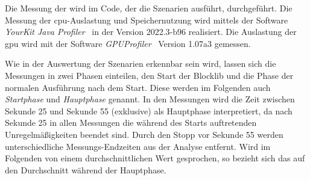 Die Messung der \si{\fps} wird im Code, der die Szenarien ausführt, durchgeführt. Die Messung der \ac{cpu}-Auslastung und Speichernutzung wird mittels der Software \emph{YourKit Java Profiler}~\cite{YourKitGmbH} in der Version 2022.3-b96 realisiert. Die Auslastung der \ac{gpu} wird mit der Software \emph{GPUProfiler}~\cite{Main2021} Version 1.07a3 gemessen. 

Wie in der Auswertung der Szenarien erkennbar sein wird, lassen sich die Messungen in zwei Phasen einteilen, den Start der Blocklib und die Phase der normalen Ausführung nach dem Start. Diese werden im Folgenden auch \emph{Startphase} und \emph{Hauptphase} genannt. In den Messungen wird die Zeit zwischen Sekunde 25 und Sekunde 55 (exklusive) als Hauptphase interpretiert, da nach Sekunde 25 in allen Messungen die während des Starts auftretenden Unregelmäßigkeiten beendet sind. Durch den Stopp vor Sekunde 55 werden unterschiedliche Messungs-Endzeiten aus der Analyse entfernt. Wird im Folgenden von einem durchschnittlichen Wert gesprochen, so bezieht sich das auf den Durchschnitt während der Hauptphase.